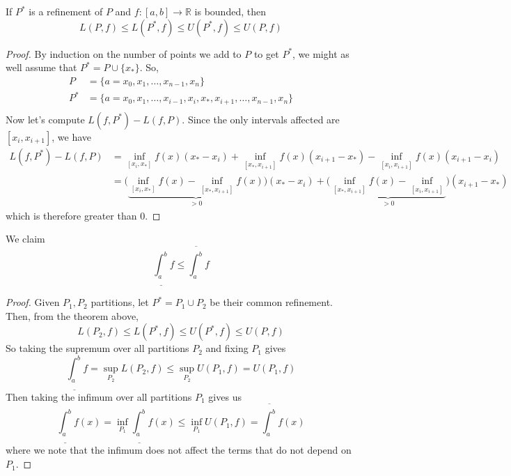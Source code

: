   \begin{lemma}
    \label{thm:fundamental-lemma}
    If $P^\ast$ is a refinement of $P$ and $f: [a, b] \to \mathbb{R}$ is bounded, then 
    \begin{equation}
      L(P, f) \leq L(P^\ast, f) \leq U(P^\ast, f) \leq U(P, f) 
    \end{equation}
  \end{lemma}
  \begin{proof} 
    By induction on the number of points we add to $P$ to get $P^\ast$, we might as well assume that $P^\ast = P \cup \{x_\ast\}$. So, 
    \begin{align}
      P & = \{a = x_0, x_1, \ldots, x_{n-1}, x_n \} \\
      P^\ast & = \{a = x_0, x_1, \ldots, x_{i-1}, x_i, x_\ast, x_{i+1}, \ldots, x_{n-1}, x_n \} \\
    \end{align}
    Now let's compute $L(f, P^\ast) - L(f, P)$. Since the only intervals affected are $[x_i, x_{i+1}]$, we have 
    \begin{align}
      L(f, P^\ast) - L(f, P) & = \inf_{[x_i, x_{\ast}]} f(x) (x_{\ast} - x_i) + \inf_{[x_\ast, x_{i+1}]} f(x) (x_{i+1} - x_\ast) - \inf_{[x_{i}, x_{i+1}]} f(x) (x_{i+1} - x_i) \\ 
                             & = \big( \underbrace{\inf_{[x_i, x_{\ast}]} f(x) - \inf_{[x_{\ast}, x_{i+1}]} f(x)}_{> 0} \big) (x_\ast - x_i) + \big( \underbrace{\inf_{[x_\ast, x_{i+1}]} f(x) - \inf_{[x_i , x_{i+1}]}}_{> 0} \big) (x_{i+1} - x_\ast) 
    \end{align}
    which is therefore greater than $0$. 
  \end{proof}

  \begin{theorem}
    \label{thm:lower-integral-does-not-exceed-upper-integral}
    We claim
    \begin{equation}
      \underline{\int_{a}^b} f \leq \overline{\int_{a}^{b}} f
    \end{equation}
  \end{theorem}
  \begin{proof}
    Given $P_1, P_2$ partitions, let $P^\ast = P_1 \cup P_2$ be their common refinement. Then, from the theorem above, 
    \begin{equation}
      L(P_2, f) \leq L(P^\ast, f) \leq U(P^\ast, f) \leq U(P, f) 
    \end{equation}
    So taking the supremum over all partitions $P_2$ and fixing $P_1$ gives 
    \begin{equation}
      \underline{\int_a^b} f = \sup_{P_2} L(P_2, f) \leq \sup_{P_2} U(P_1, f) = U(P_1, f)
    \end{equation}
    Then taking the infimum over all partitions $P_1$ gives us 
    \begin{equation}
      \underline{\int_a^b} f(x) = \inf_{P_1} \underline{\int_a^b} f(x) \leq \inf_{P_1} U(P_1, f) = \overline{\int_a^b} f(x) 
    \end{equation}
    where we note that the infimum does not affect the terms that do not depend on $P_1$. 
  \end{proof}

